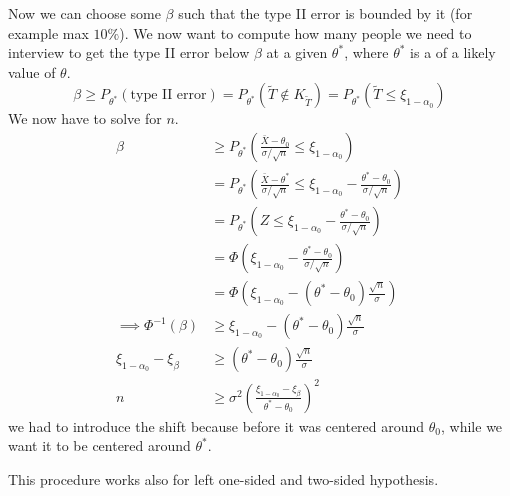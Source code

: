 \documentclass[12pt]{extarticle}
\begin{document}
Now we can choose some $\beta$ such that the type II error is bounded by it (for example max $10\%$).
We now want to compute how many people we need to interview to get the type II error below $\beta$ at a given $\theta^*$, where $\theta^*$ is a  of a likely value of $\theta$.
\begin{equation}
    \beta \geq P_{\theta^*}(\text{type II error}) = P_{\theta^*}(\tilde T \notin K_{\tilde T}) = P_{\theta^*}(\tilde T \leq \xi_{1-\alpha_0})
\end{equation}
We now have to solve for $n$.
\begin{align}
    \beta                          & \geq P_{\theta^*}\left(\frac{\bar X - \theta_0}{\sigma / \sqrt n} \leq \xi_{1-\alpha_0}\right)                                              \\
                                   & = P_{\theta^*}\left(\frac{\bar X - \theta^*}{\sigma / \sqrt n} \leq \xi_{1-\alpha_0}  - \frac{\theta^* - \theta_0}{\sigma / \sqrt n}\right) \\
                                   & = P_{\theta^*}\left(Z \leq \xi_{1-\alpha_0}  - \frac{\theta^* - \theta_0}{\sigma / \sqrt n}\right)                                          \\
                                   & = \Phi\left(\xi_{1-\alpha_0}  - \frac{\theta^* - \theta_0}{\sigma / \sqrt n}\right)                                                         \\
                                   & = \Phi\left(\xi_{1-\alpha_0}  - (\theta^* - \theta_0) \frac{\sqrt n}{\sigma}\right)                                                         \\
    \implies \Phi^{-1}(\beta)      & \geq \xi_{1-\alpha_0}  - (\theta^* - \theta_0) \frac{\sqrt n}{\sigma}                                                                       \\
    \xi_{1-\alpha_0} - \xi_{\beta} & \geq (\theta^* - \theta_0) \frac{\sqrt n}{\sigma}                                                                                           \\
    n                              & \geq \sigma^2 \left(\frac{\xi_{1-\alpha_0} - \xi_{\beta}}{\theta^* - \theta_0}\right)^2
\end{align}
we had to introduce the shift because before it was centered around $\theta_0$, while we want it to be centered around $\theta^*$.

This procedure works also for left one-sided and two-sided hypothesis.
\end{document}
